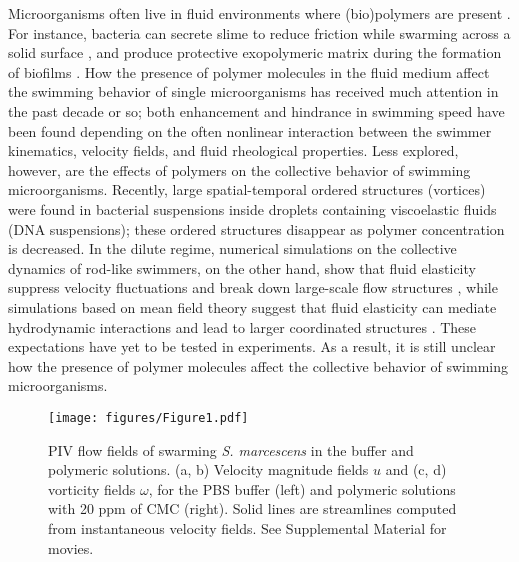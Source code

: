 \documentclass[aps,prl,floatfix,footinbib,twocolumn,superscriptaddress]{revtex4-1}
\begin{document}
Microorganisms often live in fluid environments where (bio)polymers are present \cite{Lauga_PoF_2007}. For instance, bacteria can secrete slime to reduce friction while swarming across a solid surface \cite{Angelini_PNAS_2009}, and produce protective exopolymeric matrix during the formation of biofilms \cite{Seminara_PNAS_2012}. How the presence of polymer molecules in the fluid medium affect the swimming behavior of single microorganisms has received much attention in the past decade or so; both enhancement \cite{Teran_PRL_2010,Morozov_Poon_PNAS_2014, Patteson2015,Yeomans_NatPhys_2019} and hindrance \cite{Shen_PRL_2011,Liu_PNAS_2011,Becca_PRL_2014, Qin2015} in swimming speed have been found depending on the often nonlinear interaction between the swimmer kinematics, velocity fields, and fluid rheological properties. Less explored, however, are the effects of polymers on the collective behavior of swimming microorganisms. Recently, large spatial-temporal ordered structures (vortices) were found in bacterial suspensions inside droplets containing viscoelastic fluids (DNA suspensions)\cite{Liu_Nature_2021}; these ordered structures disappear as polymer concentration is decreased. In the dilute regime, numerical simulations on the collective dynamics of rod-like swimmers, on the other hand, show that fluid elasticity suppress velocity fluctuations and break down large-scale flow structures \cite{Li_PRL_2016}, while simulations based on mean field theory suggest that fluid elasticity can mediate hydrodynamic interactions and lead to larger coordinated structures \cite{underhill_PRE_2011}. These expectations have yet to be tested in experiments. As a result, it is still unclear how the presence of polymer molecules affect the collective behavior of swimming microorganisms.


\begin{figure}[b!]\label{fig1}
\centering
\texttt{[image: figures/Figure1.pdf]}
\vspace{-2ex}
\caption{PIV flow fields of swarming \textit{S. marcescens} in the buffer and polymeric solutions. (a, b) Velocity magnitude fields $u$ and (c, d) vorticity fields $\omega$, for the PBS buffer (left) and polymeric solutions with 20 ppm of CMC (right). Solid lines are streamlines computed from instantaneous velocity fields. See Supplemental Material \cite{Supp_Mat} for movies.}
\end{figure}
\end{document}
